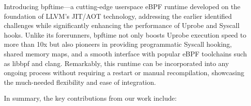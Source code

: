 Introducing bpftime—a cutting-edge userspace eBPF runtime developed on the foundation of LLVM's JIT/AOT technology, addressing the earlier identified challenges while significantly enhancing the performance of Uprobe and Syscall hooks. Unlike its forerunners, bpftime not only boosts Uprobe execution speed to more than 10x but also pioneers in providing programmatic Syscall hooking, shared memory maps, and a smooth interface with popular eBPF toolchains such as libbpf and clang. Remarkably, this runtime can be incorporated into any ongoing process without requiring a restart or manual recompilation, showcasing the much-needed flexibility and ease of integration.

In summary, the key contributions from our work include:






